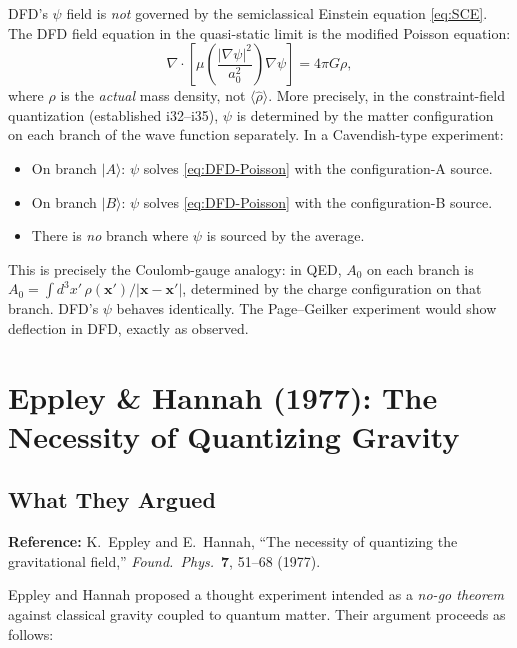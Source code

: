 \documentclass[12pt,a4paper]{article}
\begin{document}
DFD's $\psi$ field is \emph{not} governed by the semiclassical Einstein equation \eqref{eq:SCE}. The DFD field equation in the quasi-static limit is the modified Poisson equation:
\begin{equation}\label{eq:DFD-Poisson}
\nabla \cdot \left[\mu\!\left(\frac{|\nabla\psi|^2}{a_0^2}\right)\nabla\psi\right] = 4\pi G \rho,
\end{equation}
where $\rho$ is the \emph{actual} mass density, not $\langle \hat{\rho} \rangle$. More precisely, in the constraint-field quantization (established i32--i35), $\psi$ is determined by the matter configuration on each branch of the wave function separately. In a Cavendish-type experiment:
\begin{itemize}
\item On branch $|A\rangle$: $\psi$ solves \eqref{eq:DFD-Poisson} with the configuration-A source.
\item On branch $|B\rangle$: $\psi$ solves \eqref{eq:DFD-Poisson} with the configuration-B source.
\item There is \emph{no} branch where $\psi$ is sourced by the average.
\end{itemize}

This is precisely the Coulomb-gauge analogy: in QED, $A_0$ on each branch is $A_0 = \int d^3x'\, \rho(\mathbf{x}')/|\mathbf{x}-\mathbf{x}'|$, determined by the charge configuration on that branch. DFD's $\psi$ behaves identically. The Page--Geilker experiment would show deflection in DFD, exactly as observed.


\section{Eppley \& Hannah (1977): The Necessity of Quantizing Gravity}
\label{sec:eppley-hannah}

\subsection{What They Argued}

\textbf{Reference:} K.\ Eppley and E.\ Hannah, ``The necessity of quantizing the gravitational field,'' \textit{Found.\ Phys.}\ \textbf{7}, 51--68 (1977).

Eppley and Hannah proposed a thought experiment intended as a \emph{no-go theorem} against classical gravity coupled to quantum matter. Their argument proceeds as follows:
\end{document}
